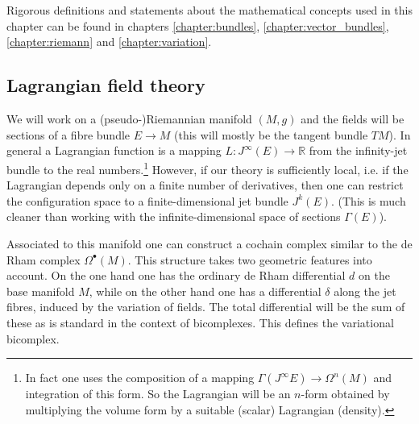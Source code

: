 \chapter{}\label{chapter:classical_fields}

    Rigorous definitions and statements about the mathematical concepts used in this chapter can be found in chapters \ref{chapter:bundles}, \ref{chapter:vector_bundles}, \ref{chapter:riemann} and \ref{chapter:variation}.

\section{Lagrangian field theory}

    We will work on a (pseudo-)Riemannian manifold $(M, g)$ and the fields will be sections of a fibre bundle $E\rightarrow M$ (this will mostly be the tangent bundle $TM$). In general a Lagrangian function is a mapping $L:J^\infty(E)\rightarrow\mathbb{R}$ from the infinity-jet bundle to the real numbers.\footnote{In fact one uses the composition of a mapping $\Gamma(J^\infty E)\rightarrow\Omega^n(M)$ and integration of this form. So the Lagrangian will be an $n$-form obtained by multiplying the volume form by a suitable (scalar) Lagrangian (density).} However, if our theory is sufficiently local, i.e. if the Lagrangian depends only on a finite number of derivatives, then one can restrict the configuration space to a finite-dimensional jet bundle $J^k(E)$. (This is much cleaner than working with the infinite-dimensional space of sections $\Gamma(E)$).

    Associated to this manifold one can construct a cochain complex similar to the de Rham complex $\Omega^\bullet(M)$. This structure takes two geometric features into account. On the one hand one has the ordinary de Rham differential $d$ on the base manifold $M$, while on the other hand one has a differential $\delta$ along the jet fibres, induced by the variation of fields. The total differential will be the sum of these as is standard in the context of bicomplexes. This defines the variational bicomplex.

